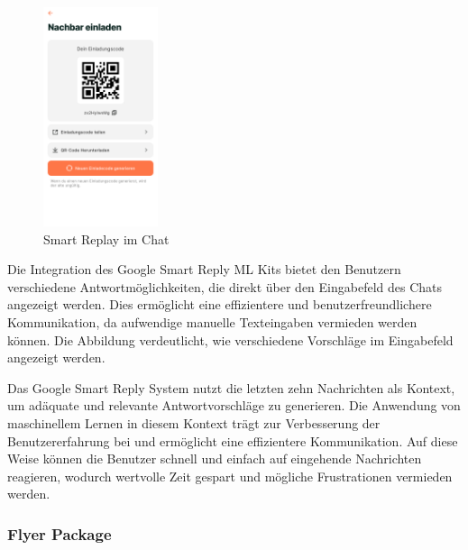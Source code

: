 \begin{figure}[H]
  \centering
  \includegraphics[width=0.3\textwidth]{pics/einladecode-page.png}
  \caption{Smart Replay im Chat}
  \label{fig:einladecode}
\end{figure}

Die Integration des Google Smart Reply ML Kits bietet den Benutzern verschiedene Antwortmöglichkeiten, die direkt über den Eingabefeld des Chats angezeigt werden. Dies ermöglicht eine effizientere und benutzerfreundlichere Kommunikation, da aufwendige manuelle Texteingaben vermieden werden können. Die Abbildung verdeutlicht, wie verschiedene Vorschläge im Eingabefeld angezeigt werden.

Das Google Smart Reply System nutzt die letzten zehn Nachrichten als Kontext, um adäquate und relevante Antwortvorschläge zu generieren. Die Anwendung von maschinellem Lernen in diesem Kontext trägt zur Verbesserung der Benutzererfahrung bei und ermöglicht eine effizientere Kommunikation. Auf diese Weise können die Benutzer schnell und einfach auf eingehende Nachrichten reagieren, wodurch wertvolle Zeit gespart und mögliche Frustrationen vermieden werden.

\subsubsection{Flyer Package}

